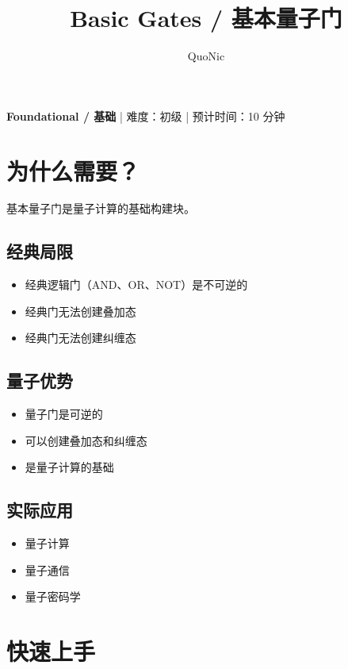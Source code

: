 \documentclass[12pt,a4paper]{article}
\title{Basic Gates / 基本量子门}
\author{QuoNic}
\date{}
\begin{document}
\maketitle

\begin{center}
\textbf{Foundational / 基础} | 难度：初级 | 预计时间：10 分钟
\end{center}

\tableofcontents
\newpage

\section{为什么需要？}

基本量子门是量子计算的基础构建块。

\subsection{经典局限}
\begin{itemize}
  \item 经典逻辑门（AND、OR、NOT）是不可逆的
  \item 经典门无法创建叠加态
  \item 经典门无法创建纠缠态
\end{itemize}

\subsection{量子优势}
\begin{itemize}
  \item 量子门是可逆的
  \item 可以创建叠加态和纠缠态
  \item 是量子计算的基础
\end{itemize}

\subsection{实际应用}
\begin{itemize}
  \item 量子计算
  \item 量子通信
  \item 量子密码学
\end{itemize}

\section{快速上手}
\end{document}
